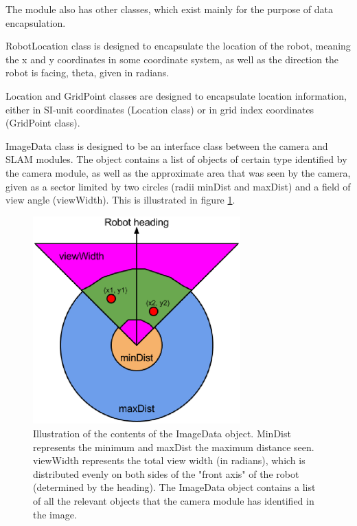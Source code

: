\documentclass[a4paper,10pt]{article}
\begin{document}
The module also has other classes, which exist mainly for the purpose of data encapsulation.

RobotLocation class is designed to encapsulate the location of the robot, meaning the x and y coordinates in some coordinate system, as well as the direction the robot is facing, theta, given in radians.

Location and GridPoint classes are designed to encapsulate location information, either in SI-unit coordinates (Location class) or in grid index coordinates (GridPoint class).

ImageData class is designed to be an interface class between the camera and SLAM modules. The object contains a list of objects of certain type identified by the camera module, as well as the approximate area that was seen by the camera, given as a sector limited by two circles (radii minDist and maxDist) and a field of view angle (viewWidth). This is illustrated in figure \ref{slam_image_data}.

\begin{figure}[h]	%
\begin{center}
\includegraphics[width=8.0cm]{slam_2.eps}
\caption{Illustration of the contents of the ImageData object. MinDist represents the minimum and maxDist the maximum distance seen. viewWidth represents the total view width (in radians), which is distributed evenly on both sides of the "front axis" of the robot (determined by the heading). The ImageData object contains a list of all the relevant objects that the camera module has identified in the image.}
\label{slam_image_data} %
\end{center}
\end{figure}
\end{document}
